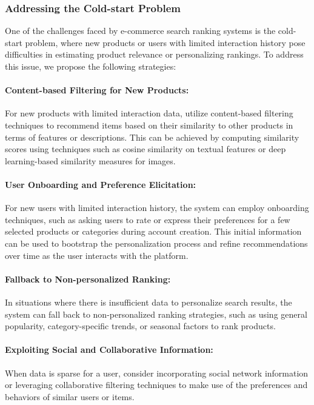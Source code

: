 \documentclass[12pt]{article}
\begin{document}
\subsubsection{Addressing the Cold-start Problem}
One of the challenges faced by e-commerce search ranking systems is the cold-start problem, where new products or users with limited interaction history pose difficulties in estimating product relevance or personalizing rankings. To address this issue, we propose the following strategies:

\paragraph{Content-based Filtering for New Products:}
For new products with limited interaction data, utilize content-based filtering techniques to recommend items based on their similarity to other products in terms of features or descriptions. This can be achieved by computing similarity scores using techniques such as cosine similarity on textual features or deep learning-based similarity measures for images.

\paragraph{User Onboarding and Preference Elicitation:}
For new users with limited interaction history, the system can employ onboarding techniques, such as asking users to rate or express their preferences for a few selected products or categories during account creation. This initial information can be used to bootstrap the personalization process and refine recommendations over time as the user interacts with the platform.

\paragraph{Fallback to Non-personalized Ranking:}
In situations where there is insufficient data to personalize search results, the system can fall back to non-personalized ranking strategies, such as using general popularity, category-specific trends, or seasonal factors to rank products.

\paragraph{Exploiting Social and Collaborative Information:}
When data is sparse for a user, consider incorporating social network information or leveraging collaborative filtering techniques to make use of the preferences and behaviors of similar users or items.
\end{document}
